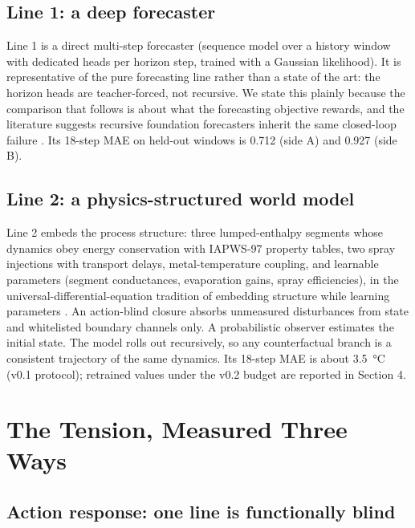 \documentclass{article}
\begin{document}
\subsection{Line 1: a deep forecaster}

Line 1 is a direct multi-step forecaster (sequence model over a history window with
dedicated heads per horizon step, trained with a Gaussian likelihood). It is
representative of the pure forecasting line rather than a state of the art: the horizon
heads are teacher-forced, not recursive. We state this plainly because the comparison
that follows is about what the forecasting objective rewards, and the literature
suggests recursive foundation forecasters inherit the same closed-loop failure
\cite{wan2026forecast}. Its 18-step MAE on held-out windows is 0.712 (side A) and 0.927
(side B).

\subsection{Line 2: a physics-structured world model}

Line 2 embeds the process structure: three lumped-enthalpy segments whose dynamics obey
energy conservation with IAPWS-97 property tables, two spray injections with transport
delays, metal-temperature coupling, and learnable parameters (segment conductances,
evaporation gains, spray efficiencies), in the universal-differential-equation
tradition of embedding structure while learning parameters
\cite{chen2018neuralode, rackauckas2020ude}. An action-blind closure absorbs unmeasured
disturbances from state and whitelisted boundary channels only. A probabilistic
observer estimates the initial state. The model rolls out recursively, so any
counterfactual branch is a consistent trajectory of the same dynamics. Its 18-step MAE
is about 3.5~\si{\degreeCelsius} (v0.1 protocol); retrained values under the v0.2
budget are reported in Section 4.

\section{The Tension, Measured Three Ways}

\subsection{Action response: one line is functionally blind}
\end{document}
